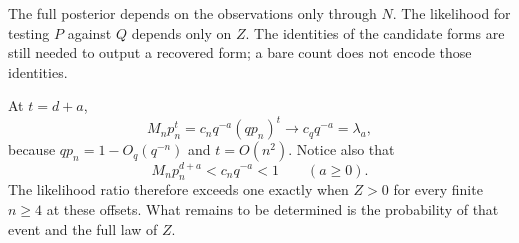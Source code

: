 The full posterior depends on the observations only through $N$. The
likelihood for testing $P$ against $Q$ depends only on $Z$. The identities of
the candidate forms are still needed to output a recovered form; a bare
count does not encode those identities.

At $t=d+a$,
\begin{equation}
 M_np_n^t=c_nq^{-a}(qp_n)^t\longrightarrow c_qq^{-a}=\lambda_a,
 \label{eq:mean-limit}
\end{equation}
because $qp_n=1-O_q(q^{-n})$ and $t=O(n^2)$. Notice also that
\begin{equation}
 M_np_n^{d+a}<c_nq^{-a}<1\qquad(a\ge0).
 \label{eq:threshold-below-one}
\end{equation}
The likelihood ratio therefore exceeds one exactly when $Z>0$ for every
finite $n\ge4$ at these offsets. What remains to be determined is the
probability of that event and the full law of $Z$.
